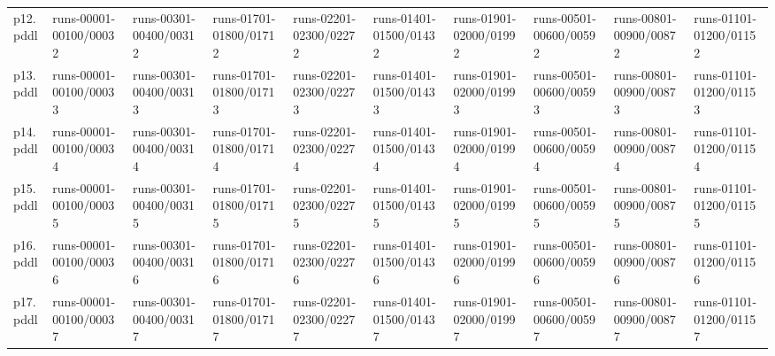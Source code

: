 \documentclass{article}
\begin{document}
\begin{tabular}{@{}lrrrrrrrrr@{}}
p12.pddl & \multicolumn{1}{|l|}{runs-00001-00100/00032} & \multicolumn{1}{|l|}{runs-00301-00400/00312} & \multicolumn{1}{|l|}{runs-01701-01800/01712} & \multicolumn{1}{|l|}{runs-02201-02300/02272} & \multicolumn{1}{|l|}{runs-01401-01500/01432} & \multicolumn{1}{|l|}{runs-01901-02000/01992} & \multicolumn{1}{|l|}{runs-00501-00600/00592} & \multicolumn{1}{|l|}{runs-00801-00900/00872} & \multicolumn{1}{|l|}{runs-01101-01200/01152} \\
p13.pddl & \multicolumn{1}{|l|}{runs-00001-00100/00033} & \multicolumn{1}{|l|}{runs-00301-00400/00313} & \multicolumn{1}{|l|}{runs-01701-01800/01713} & \multicolumn{1}{|l|}{runs-02201-02300/02273} & \multicolumn{1}{|l|}{runs-01401-01500/01433} & \multicolumn{1}{|l|}{runs-01901-02000/01993} & \multicolumn{1}{|l|}{runs-00501-00600/00593} & \multicolumn{1}{|l|}{runs-00801-00900/00873} & \multicolumn{1}{|l|}{runs-01101-01200/01153} \\
p14.pddl & \multicolumn{1}{|l|}{runs-00001-00100/00034} & \multicolumn{1}{|l|}{runs-00301-00400/00314} & \multicolumn{1}{|l|}{runs-01701-01800/01714} & \multicolumn{1}{|l|}{runs-02201-02300/02274} & \multicolumn{1}{|l|}{runs-01401-01500/01434} & \multicolumn{1}{|l|}{runs-01901-02000/01994} & \multicolumn{1}{|l|}{runs-00501-00600/00594} & \multicolumn{1}{|l|}{runs-00801-00900/00874} & \multicolumn{1}{|l|}{runs-01101-01200/01154} \\
p15.pddl & \multicolumn{1}{|l|}{runs-00001-00100/00035} & \multicolumn{1}{|l|}{runs-00301-00400/00315} & \multicolumn{1}{|l|}{runs-01701-01800/01715} & \multicolumn{1}{|l|}{runs-02201-02300/02275} & \multicolumn{1}{|l|}{runs-01401-01500/01435} & \multicolumn{1}{|l|}{runs-01901-02000/01995} & \multicolumn{1}{|l|}{runs-00501-00600/00595} & \multicolumn{1}{|l|}{runs-00801-00900/00875} & \multicolumn{1}{|l|}{runs-01101-01200/01155} \\
p16.pddl & \multicolumn{1}{|l|}{runs-00001-00100/00036} & \multicolumn{1}{|l|}{runs-00301-00400/00316} & \multicolumn{1}{|l|}{runs-01701-01800/01716} & \multicolumn{1}{|l|}{runs-02201-02300/02276} & \multicolumn{1}{|l|}{runs-01401-01500/01436} & \multicolumn{1}{|l|}{runs-01901-02000/01996} & \multicolumn{1}{|l|}{runs-00501-00600/00596} & \multicolumn{1}{|l|}{runs-00801-00900/00876} & \multicolumn{1}{|l|}{runs-01101-01200/01156} \\
p17.pddl & \multicolumn{1}{|l|}{runs-00001-00100/00037} & \multicolumn{1}{|l|}{runs-00301-00400/00317} & \multicolumn{1}{|l|}{runs-01701-01800/01717} & \multicolumn{1}{|l|}{runs-02201-02300/02277} & \multicolumn{1}{|l|}{runs-01401-01500/01437} & \multicolumn{1}{|l|}{runs-01901-02000/01997} & \multicolumn{1}{|l|}{runs-00501-00600/00597} & \multicolumn{1}{|l|}{runs-00801-00900/00877} & \multicolumn{1}{|l|}{runs-01101-01200/01157} \\

\end{tabular}
\end{document}
